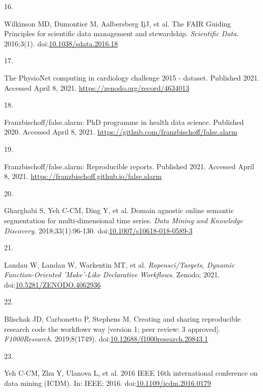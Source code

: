 \documentclass[12pt,twoside]{reedthesis}
\newlength{\csllabelwidth}
\newlength{\cslhangindent}
\newenvironment{CSLReferences}[2] %
 {%
  \setlength{\parindent}{0pt}
  \ifodd #1 \everypar{\setlength{\hangindent}{\cslhangindent}}\ignorespaces\fi
  \ifnum #2 > 0
  \setlength{\parskip}{#2\baselineskip}
  \fi
 }%
 {}
\newcommand{\CSLLeftMargin}[1]{\parbox[t]{\csllabelwidth}{#1}}
\newcommand{\CSLRightInline}[1]{\parbox[t]{\linewidth - \csllabelwidth}{#1}}
\begin{document}
\begin{CSLReferences}{0}{0}
\leavevmode{}%
\CSLLeftMargin{16. }
\CSLRightInline{Wilkinson MD, Dumontier M, Aalbersberg IjJ, et al. The FAIR Guiding Principles for scientific data management and stewardship. \emph{Scientific Data}. 2016;3(1). doi:\href{https://doi.org/10.1038/sdata.2016.18}{10.1038/sdata.2016.18}}

\leavevmode{}%
\CSLLeftMargin{17. }
\CSLRightInline{The PhysioNet computing in cardiology challenge 2015 - dataset. Published 2021. Accessed April 8, 2021. \url{https://zenodo.org/record/4634013}}

\leavevmode{}%
\CSLLeftMargin{18. }
\CSLRightInline{Franzbischoff/false.alarm: PhD programme in health data science. Published 2020. Accessed April 8, 2021. \url{https://github.com/franzbischoff/false.alarm}}

\leavevmode{}%
\CSLLeftMargin{19. }
\CSLRightInline{Franzbischoff/false.alarm: Reproducible reports. Published 2021. Accessed April 8, 2021. \url{https://franzbischoff.github.io/false.alarm}}

\leavevmode{}%
\CSLLeftMargin{20. }
\CSLRightInline{Gharghabi S, Yeh C-CM, Ding Y, et al. Domain agnostic online semantic segmentation for multi-dimensional time series. \emph{Data Mining and Knowledge Discovery}. 2018;33(1):96-130. doi:\href{https://doi.org/10.1007/s10618-018-0589-3}{10.1007/s10618-018-0589-3}}

\leavevmode{}%
\CSLLeftMargin{21. }
\CSLRightInline{Landau W, Landau W, Warkentin MT, et al. \emph{Ropensci/Targets, Dynamic Function-Oriented 'Make'-Like Declarative Workflows}. Zenodo; 2021. doi:\href{https://doi.org/10.5281/ZENODO.4062936}{10.5281/ZENODO.4062936}}

\leavevmode{}%
\CSLLeftMargin{22. }
\CSLRightInline{Blischak JD, Carbonetto P, Stephens M. Creating and sharing reproducible research code the workflowr way {[}version 1; peer review: 3 approved{]}. \emph{F1000Research}. 2019;8(1749). doi:\href{https://doi.org/10.12688/f1000research.20843.1}{10.12688/f1000research.20843.1}}

\leavevmode{}%
\CSLLeftMargin{23. }
\CSLRightInline{Yeh C-CM, Zhu Y, Ulanova L, et al. 2016 IEEE 16th international conference on data mining (ICDM). In: IEEE; 2016. doi:\href{https://doi.org/10.1109/icdm.2016.0179}{10.1109/icdm.2016.0179}}


\end{CSLReferences}
\end{document}
